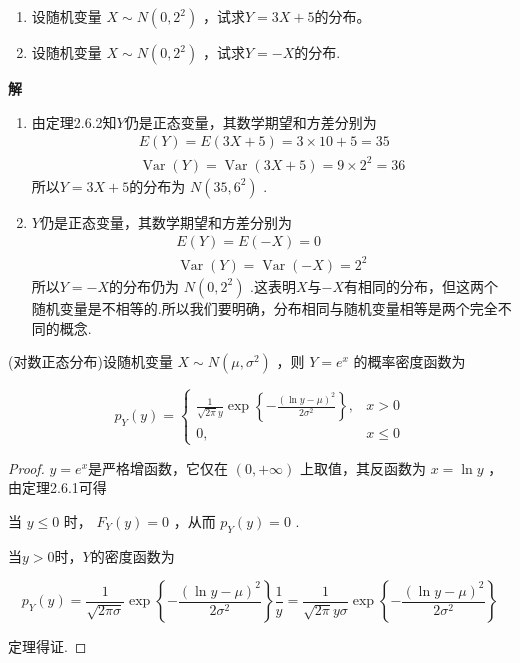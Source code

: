 \begin{example}
	\begin{enumerate}
		\item 设随机变量 $X \sim N\left(0,2^{2}\right)$ ，试求$ Y=3X+5 $的分布。
		\item 设随机变量 $X \sim N\left(0,2^{2}\right)$ ，试求$ Y=-X $的分布.
	\end{enumerate}
	
	\textbf{解}
	
	\begin{enumerate}
		\item 由定理2.6.2知$ Y $仍是正态变量，其数学期望和方差分别为
		\[
		\begin{array}{l}{E(Y)=E(3 X+5)=3 \times 10+5=35} \\ {\operatorname{Var}(Y)=\operatorname{Var}(3 X+5)=9 \times 2^{2}=36}\end{array}
		\]
		所以$ Y=3X+5 $的分布为 $N\left(35,6^{2}\right)$ .
		\item $ Y $仍是正态变量，其数学期望和方差分别为
		\[
		\begin{array}{l}{E(Y)=E(-X)=0} \\ {\operatorname{Var}(Y)=\operatorname{Var}(-X)=2^{2}}\end{array}
		\]
		所以$ Y=-X $的分布仍为 $N\left(0,2^{2}\right)$ .这表明$ X $与$ -X $有相同的分布，但这两个随机变量是不相等的.所以我们要明确，分布相同与随机变量相等是两个完全不同的概念.
	\end{enumerate}
\end{example}

\begin{theorem}
	(对数正态分布)设随机变量 $X \sim N\left(\mu, \sigma^{2}\right)$ ，则 $Y=e^{x}$ 的概率密度函数为
	
	\begin{equation}
	p_{Y}(y)=\left\{\begin{array}{ll}{\frac{1}{\sqrt{2 \pi} y} \exp \left\{-\frac{(\ln y-\mu)^{2}}{2 \sigma^{2}}\right\},} & {x>0} \\ {0,} & {x \leqslant 0}\end{array}\right. \label{eq:2.6.2}
	\end{equation}
\end{theorem}

\begin{proof}
	$y=e^{x}$是严格增函数，它仅在 $(0,+\infty)$ 上取值，其反函数为 $x=\ln y$ ，由定理2.6.1可得
	
	当 $y \leqslant 0$ 时， $F_{Y}(y)=0$ ，从而 $p_{Y}(y)=0$ .
	
	当$ y>0 $时，$ Y $的密度函数为
	
	\[
	p_{Y}(y)=\frac{1}{\sqrt{2 \pi \sigma}} \exp \left\{-\frac{(\ln y-\mu)^{2}}{2 \sigma^{2}}\right\} \frac{1}{y}=\frac{1}{\sqrt{2 \pi} y \sigma} \exp \left\{-\frac{(\ln y-\mu)^{2}}{2 \sigma^{2}}\right\}
	\]
	
	定理得证.
\end{proof} 


